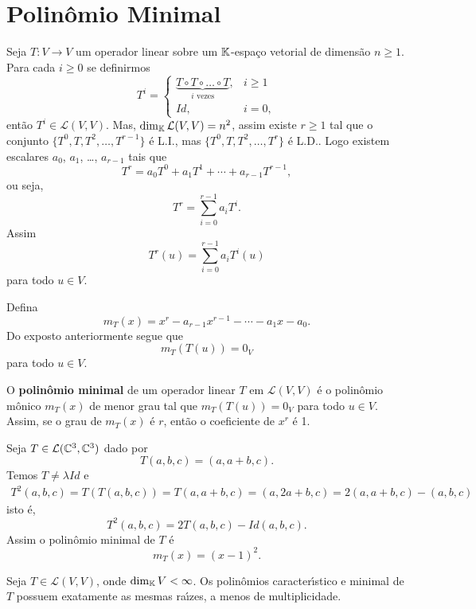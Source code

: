 
\section{Polin\^omio Minimal} %
\label{sec:polinomio_minimal}

Seja $T : V \to V$ um operador linear sobre um $\mathbb{K}$-espa\c{c}o vetorial de dimens\~ao $n \ge 1$. Para cada $i \ge 0$ se definirmos
\[
    T^i = \begin{cases}
        \underbrace{T\circ T \circ \dots \circ T}_{i \mbox{ vezes}}, & i \ge 1\\
        Id, & i = 0,
    \end{cases}
\]
ent\~ao $T^i \in \mathcal{L}(V,V)$. Mas, $\dim_{\mathbb{K}} \mathcal{L}(V,V) = n^2$, assim existe $r \ge 1$ tal que o conjunto $\{T^0, T, T^2, \dots, T^{r - 1}\}$ \'e L.I., mas $\{T^0, T, T^2, \dots, T^r\}$ \'e L.D.. Logo existem escalares $a_0$, $a_1$, \dots, $a_{r - 1}$ tais que
\[
    T^r = a_0T^0 + a_1T^1 + \cdots + a_{r - 1}T^{r - 1},
\]
ou seja,
\[
    T^r = \sum_{i = 0}^{r - 1}a_iT^i.
\]
Assim
\[
    T^r(u) = \sum_{i = 0}^{r - 1}a_iT^i(u)
\]
para todo $u \in V$.

Defina
\[
    m_T(x) = x^r - a_{r - 1}x^{r - 1} - \cdots - a_1x - a_0.
\]
Do exposto anteriormente segue que
\[
    m_T(T(u)) = 0_V
\]
para todo $u \in V$.

\begin{definicao}
    O \textbf{polin\^omio minimal} de um operador linear $T$ em $\mathcal{L}(V,V)$ \'e o polin\^omio m\^onico $m_T(x)$ de menor grau tal que $m_T(T(u)) = 0_V$ para todo $u \in V$. Assim, se o grau de $m_T(x)$ \'e $r$, ent\~ao o coeficiente de $x^r$ \'e 1.
\end{definicao}

\begin{exemplo}
    Seja $T \in \mathcal{L}(\mathbb{C}^3, \mathbb{C}^3)$ dado por
    \[
        T(a, b, c) = (a, a + b, c).
    \]
    Temos $T \ne \lambda Id$ e
    \begin{align*}
        T^2(a,b,c) = T(T(a,b,c)) = T(a,a+b,c) = (a,2a+b,c) = 2(a,a+b,c) - (a,b,c)
    \end{align*}
    isto \'e,
    \[
        T^2(a,b,c) = 2T(a,b,c) - Id(a,b,c).
    \]
    Assim o polin\^omio minimal de $T$ \'e
    \[
        m_T(x) = (x - 1)^2.
    \]
\end{exemplo}

\begin{teorema}
    Seja $T \in \mathcal{L}(V,V)$, onde $\dim_{\mathbb{K}} V < \infty$. Os polin\^omios caracter{\'\i}stico e minimal de $T$ possuem exatamente as mesmas ra{\'\i}zes, a menos de multiplicidade.
\end{teorema}

